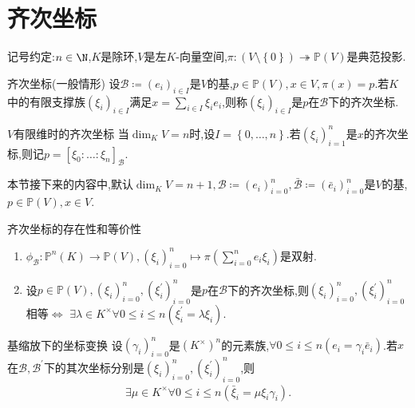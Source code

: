 \section{齐次坐标}

记号约定:$n\in\N$,$K$是除环,$V$是左$K$-向量空间,$\pi:\left(V\setminus\left\{0\right\}\right)\twoheadrightarrow\mathbb{P}\left(V\right)$是典范投影.

\begin{definition}{齐次坐标(一般情形)}{}
	设$\mathcal{B}\coloneq\left(e_{i}\right)_{i\in I}$是$V$的基,$p\in\mathbb{P}\left(V\right),x\in V,\pi\left(x\right)=p$.若$K$中的有限支撑族$\left(\xi_{i}\right)_{i\in I}$满足$x=\sum\limits_{i\in I}\xi_{i}e_{i}$,则称$\left(\xi_{i}\right)_{i\in I}$是$p$在$\mathcal{B}$下的齐次坐标.
\end{definition}

\begin{remark}{$V$有限维时的齐次坐标}{}
	当$\dim_{K}V=n$时,设$I=\left\{0,\ldots,n\right\}$.若$\left(\xi_{i}\right)_{i=1}^{n}$是$x$的齐次坐标,则记$p=\left[\xi_{0}:\ldots:\xi_{n}\right]_{\mathcal{B}}$.
\end{remark}

本节接下来的内容中,默认$\dim_{K}V=n+1,\mathcal{B}\coloneq\left(e_{i}\right)_{i=0}^{n},\bar{\mathcal{B}}\coloneq\left(\bar{e}_{i}\right)_{i=0}^{n}$是$V$的基,$p\in\mathbb{P}\left(V\right),x\in V$.

\begin{proposition}{齐次坐标的存在性和等价性}{}
	\begin{enumerate}
		\item $\phi_{\mathcal{B}}:\mathbb{P}^{n}\left(K\right)\to\mathbb{P}\left(V\right),\left(\xi_{i}\right)_{i=0}^{n}\mapsto\pi\left(\sum\limits_{i=0}^{n}e_{i}\xi_{i}\right)$是双射.
		\item 设$p\in\mathbb{P}\left(V\right),\left(\xi_{i}\right)_{i=0}^{n},\left(\xi_{i}^{\prime}\right)_{i=0}^{n}$是$p$在$\mathcal{B}$下的齐次坐标,则$\left(\xi_{i}\right)_{i=0}^{n},\left(\xi_{i}^{\prime}\right)_{i=0}^{n}$相等$\iff$ $\exists\lambda\in K^{\times}\forall 0\leq i\leq n\left(\xi_{i}^{\prime}=\lambda\xi_{i}\right)$.
	\end{enumerate}
\end{proposition}

\begin{corollary}{基缩放下的坐标变换}{}
	设$\left(\gamma_{i}\right)_{i=0}^{n}$是$\left(K^{\times}\right)^{n}$的元素族,$\forall 0\leq i\leq n\left(e_{i}=\gamma_{i}\bar{e}_{i}\right)$.若$x$在$\mathcal{B},\mathcal{B}^{\prime}$下的其次坐标分别是$\left(\xi_{i}\right)_{i=0}^{n},\left(\xi_{i}^{\prime}\right)_{i=0}^{n}$,则
	\begin{align*}
		\exists\mu\in K^{\times}\forall 0\leq i\leq n\left(\bar{\xi}_{i}=\mu\xi_{i}\gamma_{i}\right).
	\end{align*}
\end{corollary}
